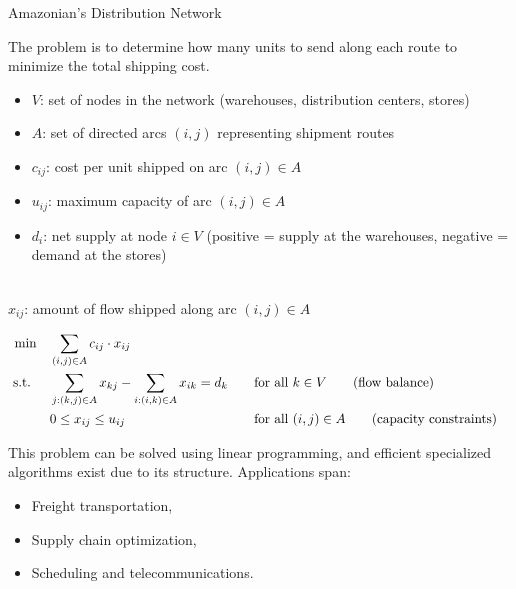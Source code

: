 \begin{example}{Amazonian's Distribution Network}{}
\begin{center}
\par{}\label{fig:modeling-sums-continued-tikz03}%

\end{center}

\noindent The problem is to determine how many units to send along each route to minimize the total shipping cost.

\smallskip {}
\begin{itemize}
\item \( V \): set of nodes in the network (warehouses, distribution centers, stores)
\item \( A \): set of directed arcs \( (i,j) \) representing shipment routes
\end{itemize}

\smallskip {}
\begin{itemize}
\item \( c_{ij} \): cost per unit shipped on arc \( (i, j) \in A \)
\item \( u_{ij} \): maximum capacity of arc \( (i, j) \in A \)
\item \( d_i \): net supply at node \( i \in V \) (positive = supply at the warehouses, negative = demand at the stores)
\end{itemize}

\smallskip {} \\
\( x_{ij} \): amount of flow shipped along arc \( (i, j) \in A \)

\smallskip {}
\begin{align*}
\min \quad & \sum_{(i,j) \in A} c_{ij} \cdot x_{ij} \\
\mbox{ s.t. } \quad
& \sum_{j : (k,j) \in A} x_{kj} - \sum_{i : (i,k) \in A} x_{ik} = d_k &&\quad \mbox{for all } k \in V   \tag{flow balance} \\
& 0 \leq x_{ij} \leq u_{ij} &&\quad \mbox{for all } (i,j) \in A   \tag{capacity constraints}
\end{align*}

\noindent This problem can be solved using linear programming, and efficient specialized algorithms exist due to its structure. Applications span:
\begin{itemize}
    \item Freight transportation,
    \item Supply chain optimization,
    \item Scheduling and telecommunications.
\end{itemize}
\end{example}

